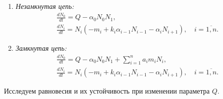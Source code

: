     \begin{enumerate}[label={\asbuk*)}, ref=\asbuk*]
        \item \textit{Незамкнутая цепь:}
        \begin{equation}  \label{flow}
            \begin{split}
                & \frac{dN_0}{dt} = Q - \alpha_0 N_0 N_1, \\
                & \frac{dN_i}{dt} = N_i (-m_i + k_i \alpha_{i-1} N_{i-1}  - \alpha_i N_{i+1}), \quad i=\overline{1,n}.
            \end{split}
        \end{equation}

        \item \textit{Замкнутая цепь:}
        \begin{equation} \label{cycle}
            \begin{split}
                & \frac{dN_0}{dt} = Q - \alpha_0 N_0 N_1  + \sum_{i=1}^{n} a_i m_i N_i, \\
                & \frac{dN_i}{dt} = N_i (-m_i + k_i \alpha_{i-1} N_{i-1}  - \alpha_i N_{i+1}), \quad i=\overline{1,n}.
            \end{split}
        \end{equation}
    \end{enumerate}

    Исследуем равновесия и их устойчивость при изменении параметра \(Q\).
